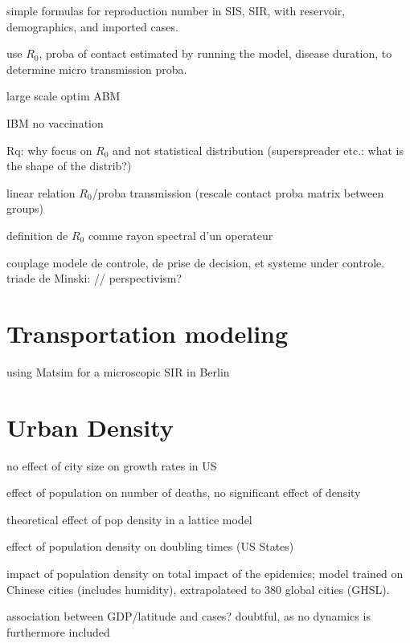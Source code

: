 \documentclass[10pt]{article}
\begin{document}
\cite{mclure2020some} simple formulas for reproduction number in SIS, SIR, with reservoir, demographics, and imported cases.

\cite{hunter2018open} use $R_0$, proba of contact estimated by running the model, disease duration, to determine micro transmission proba.

\cite{willem2015optimizing} large scale optim ABM  

\cite{kisjes2014individual} IBM no vaccination
	
Rq: why focus on $R_0$ and not statistical distribution (superspreader etc.: what is the shape of the distrib?)

\cite{chao2010flute} linear relation $R_0$/proba transmission (rescale contact proba matrix between groups)
	
\cite{bacaer2011parametre} definition de $R_0$ comme rayon spectral d'un operateur

\cite{bonte2011modelisation} couplage modele de controle, de prise de decision, et systeme under controle. triade de Minski: // perspectivism?




\section{Transportation modeling}

\cite{11303_10945} using Matsim for a microscopic SIR in Berlin


	

	
\section{Urban Density}


\cite{2020arXiv200401248H} no effect of city size on growth rates in US
	
\cite{angel2020coronavirus} effect of population on number of deaths, no significant effect of density

\cite{tarwater2001effects} theoretical effect of pop density in a lattice model	

\cite{White2020.04.14.20065318} effect of population density on doubling times (US States)
	
\cite{Rader2020.04.15.20064980} impact of population density on total impact of the epidemics; model trained on Chinese cities (includes humidity), extrapolateed to 380 global cities (GHSL).

\cite{2020arXiv200400110M} association between GDP/latitude and cases? doubtful, as no dynamics is furthermore included
\end{document}
